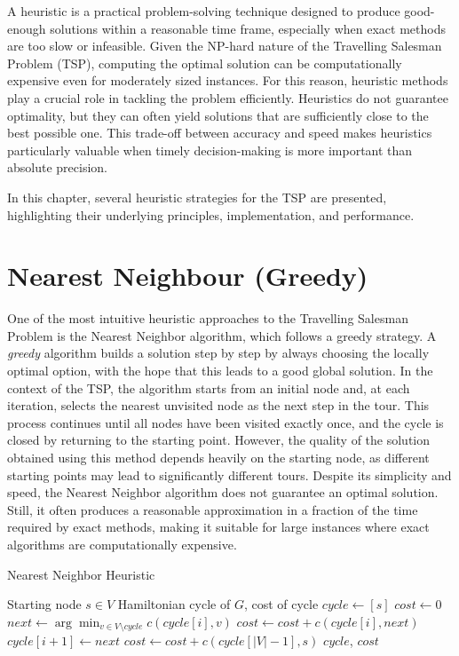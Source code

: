 A heuristic is a practical problem-solving technique designed to produce good-enough solutions within a reasonable time frame, 
especially when exact methods are too slow or infeasible. Given the NP-hard nature of the Travelling Salesman Problem (TSP), 
computing the optimal solution can be computationally expensive even for moderately sized instances. For this reason, heuristic methods 
play a crucial role in tackling the problem efficiently. Heuristics do not guarantee optimality, but they can often yield solutions 
that are sufficiently close to the best possible one. This trade-off between accuracy and speed makes heuristics particularly valuable 
when timely decision-making is more important than absolute precision.

In this chapter, several heuristic strategies for the TSP are presented, highlighting their underlying principles, implementation, and performance.

\section{Nearest Neighbour (Greedy)}

One of the most intuitive heuristic approaches to the Travelling Salesman Problem is the Nearest Neighbor algorithm, which follows a greedy strategy. 
A \textit{greedy} algorithm builds a solution step by step by always choosing the locally optimal option, with the hope that this leads to a good global solution.
In the context of the TSP, the algorithm starts from an initial node and, at each iteration, selects the nearest unvisited node as the next step in the tour. 
This process continues until all nodes have been visited exactly once, and the cycle is closed by returning to the starting point.
However, the quality of the solution obtained using this method depends heavily on the starting node, as different starting points may lead to significantly 
different tours.
Despite its simplicity and speed, the Nearest Neighbor algorithm does not guarantee an optimal solution. Still, it often produces a reasonable approximation 
in a fraction of the time required by exact methods, making it suitable for large instances where exact algorithms are computationally expensive.

\begin{algorithm}
\caption{Nearest Neighbor Heuristic}
\begin{algorithmic}
  \Require Starting node $s \in V$
  \Ensure Hamiltonian cycle of $G$, cost of cycle
  \State $cycle \gets [s]$
  \State $cost \gets 0$
    \State $next \gets \arg\min_{v \in V \setminus cycle} c(cycle[i], v)$
    \State $cost \gets cost + c(cycle[i], next)$
    \State $cycle[i+1] \gets next$
  \EndFor
  \State $cost \gets cost + c(cycle[|V| - 1], s)$
  \State \Return $cycle$, $cost$
\end{algorithmic}
\end{algorithm}

